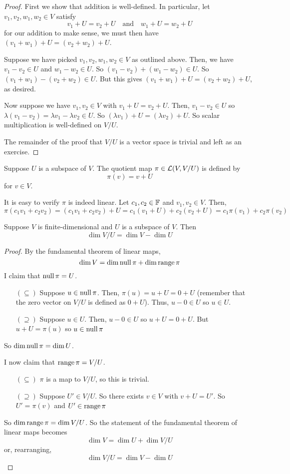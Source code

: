 \begin{proof}
    First we show that addition is well-defined. In particular, let $v_1,v_2,w_1,w_2\in V$ satisfy
    \[ v_1 + U = v_2 + U \quad\text{and}\quad w_1+U=w_2+U \]
    for our addition to make sense, we must then have $(v_1+w_1) + U = (v_2+w_2) + U$.

    Suppose we have picked $v_1,v_2,w_1,w_2\in V$ as outlined above. Then, we have $v_1 - v_2 \in U$ and $w_1 - w_2 \in U$. So $(v_1-v_2) + (w_1 - w_2) \in U$. So $(v_1 + w_1) - (v_2 + w_2) \in U$. But this gives $(v_1 + w_1) + U = (v_2 + w_2) + U$, as desired.

    Now suppose we have $v_1,v_2\in V$ with $v_1 + U = v_2 + U$. Then, $v_1 -v_2\in U$ so $\lambda(v_1-v_2) = \lambda v_1 - \lambda v_2 \in U$. So $(\lambda v_1) + U = (\lambda v_2) + U$. So scalar multiplication is well-defined on $V/U$.

    The remainder of the proof that $V/U$ is a vector space is trivial and left as an exercise.
\end{proof}
\begin{definition}
    Suppose $U$ is a subspace of $V$. The quotient map $\pi \in \mathcal{L}(V, V/U)$ is defined by
    \[ \pi(v) = v + U\]
    for $v\in V$.
\end{definition}
It is easy to verify $\pi$ is indeed linear. Let $c_1,c_2\in \mathbb F$ and $v_1,v_2\in V$. Then,
\[ \pi(c_1v_1 + c_2v_2) = (c_1v_1 + c_2v_2) + U = c_1(v_1 + U) + c_2(v_2 + U) = c_1\pi(v_1) + c_2\pi(v_2)\]
\begin{theorem}
    Suppose $V$ is finite-dimensional and $U$ is a subspace of $V$. Then
    \[ \dim V/U = \dim V - \dim U\]
\end{theorem}
\begin{proof}
    By the fundamental theorem of linear maps,
    \[ \dim V = \dim \operatorname{null} \pi + \dim \operatorname{range} \pi \]
    I claim that $\operatorname{null} \pi = U$. 
    \begin{enumerate}
        \item[$(\subseteq)$] Suppose $u \in \operatorname{null} \pi$. Then, $\pi(u) = u + U = 0 + U$ (remember that the zero vector on $V/U$ is defined as $0 + U$). Thus, $u-0 \in U$ so $u\in U$.
        \item[$(\supseteq)$] Suppose $u\in U$. Then, $u-0\in U$ so $u + U = 0 + U$. But $u+U=\pi(u)$ so $u\in\operatorname{null} \pi$
    \end{enumerate}
    So $\dim\operatorname{null}\pi = \dim U$.

    I now claim that $\operatorname{range}\pi = V/U$. 
    \begin{enumerate}
        \item[$(\subseteq)$] $\pi$ is a map to $V/U$, so this is trivial.
        \item[$(\supseteq)$] Suppose $U' \in V/U$. So there exists $v\in V$ with $v + U = U'$. So $U' = \pi(v)$ and $U' \in \operatorname{range} \pi$
    \end{enumerate}
    So $\dim\operatorname{range}\pi = \dim V/U$. So the statement of the fundamental theorem of linear maps becomes
    \[ \dim V = \dim U + \dim V/U \]
    or, rearranging,
    \[ \dim V/U = \dim V - \dim U\]
\end{proof}
